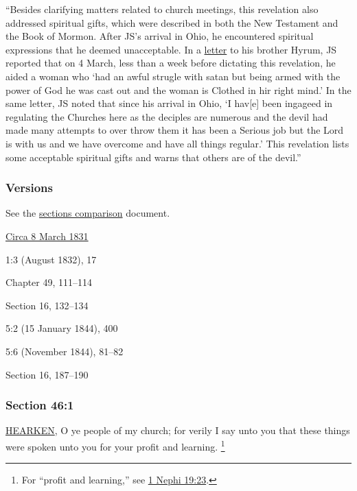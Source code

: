			``Besides clarifying matters related to church meetings, this revelation also addressed spiritual gifts, which were described in both the New Testament and the Book of Mormon. After JS's arrival in Ohio, he encountered spiritual expressions that he deemed unacceptable. In a \hyperref[EMS-1831-JS-3-4-MAR-1831]{letter} to his brother Hyrum, JS reported that on 4 March, less than a week before dictating this revelation, he aided a woman who `had an awful strugle with satan but being armed with the power of God he was cast out and the woman is Clothed in hir right mind.' In the same letter, JS noted that since his arrival in Ohio, `I hav[e] been ingageed in regulating the Churches here as the deciples are numerous and the devil had made many attempts to over throw them it has been a Serious job but the Lord is with us and we have overcome and have all things regular.' This revelation lists some acceptable spiritual gifts and warns that others are of the devil.''
		
	\subsubsection{Versions}
		\label{DC46-V}
		
		See the \href{https://drive.google.com/file/d/1goAvNz8jS4R8slYfMG_db55Ty2z_vmgK/view?usp=sharing}{sections comparison} document.
	
		\begin{compactdesc}
			\item[JSP] \hyperref[EMS-1831-JS-CIR-8-MAR-1831-A]{Circa 8 March 1831}
			\item[EMS] 1:3 (August 1832), 17
			\item[BC] Chapter 49, 111--114
			\item[DC 1835] Section 16, 132--134
			\item[TS] 5:2 (15 January 1844), 400
			\item[MS] 5:6 (November 1844), 81--82
			\item[DC 1844] Section 16, 187--190
		\end{compactdesc}

	\subsubsection{Section 46:1} %
		\label{DC46-1}

		\hyperref[HEARKEN]{HEARKEN}, O ye people of my church; for verily I say unto you that these things were spoken unto you for your profit and learning.%
			\footnote{%
				For ``profit and learning,'' see \hyperref[1NEPHI-19-23]{1 Nephi 19:23}.
				}

